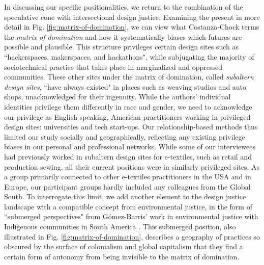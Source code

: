 In discussing our specific positionalities, we return to the combination of the speculative cone with intersectional design justice. Examining the present in more detail in Fig. \ref{fig:matrix-of-domination}, we can view what Costanza-Chock terms the \textit{matrix of domination} and how it systematically biases which futures are possible and plausible. This structure privileges certain design sites such as ``hackerspaces, makerspaces, and hackathons", while subjugating the majority of sociotechnical practice that takes place in marginalized and oppressed communities. These other sites under the matrix of domination, called \textit{subaltern design sites}, ``have always existed" in places such as weaving studios and auto shops, unacknowledged for their ingenuity. 
While the authors' individual identities privilege them differently in race and gender, we need to acknowledge our privilege as English-speaking, American practitioners working in privileged design sites: universities and tech start-ups. 
Our relationship-based methods thus limited our study socially and geographically, reflecting any existing privilege biases in our personal and professional networks. While some of our interviewees had previously worked in subaltern design sites for e-textiles, such as retail and production sewing, all their current positions were in similarly privileged sites. As a group primarily connected to other e-textiles practitioners in the USA and in Europe, our participant groups hardly included any colleagues from the Global South. 
To interrogate this limit, we add another element to the design justice landscape with a compatible concept from environmental justice, in the form of ``submerged perspectives" from G\'{o}mez-Barris' work in environmental justice with Indigenous communities in South America \cite{gomez-barris_extractive_2017}. This submerged position, also illustrated in Fig. \ref{fig:matrix-of-domination}, describes a geography of practices so obscured by the surface of colonialism and global capitalism that they find a certain form of autonomy from being invisible to the matrix of domination.  

